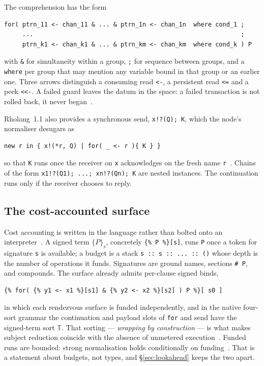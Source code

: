 \documentclass[11pt]{article}
\theoremstyle{branddef}
\theoremstyle{brandplain}
\theoremstyle{brandrem}
\newcommand{\T}{\mathbb{T}}
\newcommand{\signed}[2]{\{#1\}_{#2}}
\begin{document}
The comprehension has the form
\begin{lstlisting}
for( ptrn_11 <- chan_11 & ... & ptrn_1n <- chan_1n  where cond_1 ;
     ...                                                         ;
     ptrn_k1 <- chan_k1 & ... & ptrn_km <- chan_km  where cond_k ) P
\end{lstlisting}
with \texttt{\&} for simultaneity within a group, \texttt{;} for sequence
between groups, and a \texttt{where} per group that may mention any variable
bound in that group or an earlier one. Three arrows distinguish a consuming
read \texttt{<-}, a persistent read \texttt{<=} and a peek \texttt{<<-}. A
failed guard leaves the datum in the space: a failed transaction is not rolled
back, it never began~\cite{F1R3Dev}.

Rholang~1.1 also provides a synchronous send, \verb|x!?(Q); K|, which the
node's normaliser desugars as
\begin{lstlisting}
new r in { x!(*r, Q) | for( _ <- r ){ K } }
\end{lstlisting}
so that \texttt{K} runs once the receiver on \texttt{x} acknowledges on the
fresh name \texttt{r}~\cite{f1r3nodeOTE}. Chains of the form
\verb|x1!?(Q1); ...; xn!?(Qn); K| are nested instances. The continuation runs
only if the receiver chooses to reply.

\subsection{The cost-accounted surface}

Cost accounting is written in the language rather than bolted onto an
interpreter~\cite{CostRho}. A signed term \(\signed{P}{s}\), concretely
\verb|{% P %}[s]|, runs \texttt{P} once a token for signature \texttt{s} is
available; a budget is a stack \verb|s :: s :: ... :: ()| whose depth is the
number of operations it funds. Signatures are ground names, sections
\verb|# P|, and compounds. The surface already admits per-clause signed binds,
\begin{lstlisting}
{% for( {% y1 <- x1 %}[s1] & {% y2 <- x2 %}[s2] ) P %}[ s0 ]
\end{lstlisting}
in which each rendezvous surface is funded independently, and in the native
four-sort grammar the continuation and payload slots of \texttt{for} and send
have the signed-term sort \(\T\). That sorting --- \emph{wrapping by
construction} --- is what makes subject reduction coincide with the absence of
unmetered execution~\cite{CostMonad}. Funded runs are bounded: strong
normalisation holds conditionally on funding~\cite{f1r3nodeOTE}. That is a
statement about budgets, not types, and \S\ref{sec:lookahead} keeps the two
apart.
\end{document}
